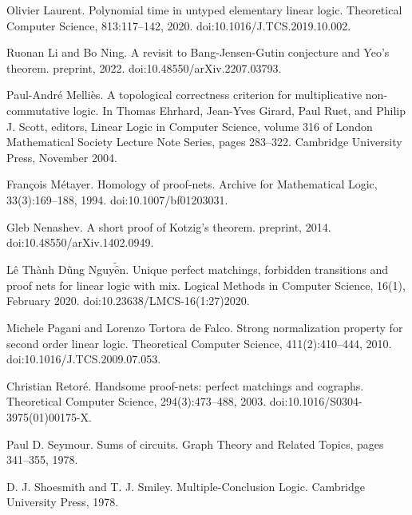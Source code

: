 \par\noindent  [27]  Olivier Laurent.  Polynomial time in untyped elementary linear logic.  Theoretical Computer Science, 813:117–142, 2020.  doi:10.1016/J.TCS.2019.10.002.  
 
\par\noindent  [28]  Ruonan Li and Bo Ning.  A revisit to Bang-Jensen-Gutin conjecture and Yeo’s theorem.  preprint, 2022.  doi:10.48550/arXiv.2207.03793.  
 
\par\noindent  [29]  Paul-André Melliès.  A topological correctness criterion for multiplicative non-commutative logic.  In Thomas Ehrhard, Jean-Yves Girard, Paul Ruet, and Philip J. Scott, editors, Linear Logic in Computer Science, volume 316 of London Mathematical Society Lecture Note Series, pages 283–322. Cambridge University Press, November 2004.  
 
\par\noindent  [30]  François Métayer.  Homology of proof-nets.  Archive for Mathematical Logic, 33(3):169–188, 1994.  doi:10.1007/bf01203031.  
 
\par\noindent  [31]  Gleb Nenashev.  A short proof of Kotzig’s theorem.  preprint, 2014.  doi:10.48550/arXiv.1402.0949.  
 
\par\noindent  [32]  Lê Thành Dũng Nguy$\tilde{\hat{\text{e}}}$n.  Unique perfect matchings, forbidden transitions and proof nets for linear logic with mix.  Logical Methods in Computer Science, 16(1), February 2020.  doi:10.23638/LMCS-16(1:27)2020.  
 
\par\noindent  [33]  Michele Pagani and Lorenzo Tortora de Falco.  Strong normalization property for second order linear logic.  Theoretical Computer Science, 411(2):410–444, 2010.  doi:10.1016/J.TCS.2009.07.053.  
 
\par\noindent  [34]  Christian Retoré.  Handsome proof-nets: perfect matchings and cographs.  Theoretical Computer Science, 294(3):473–488, 2003.  doi:10.1016/S0304-3975(01)00175-X.  
 
\par\noindent  [35]  Paul D. Seymour.  Sums of circuits.  Graph Theory and Related Topics, pages 341–355, 1978.  
 
\par\noindent  [36]  D. J. Shoesmith and T. J. Smiley.  Multiple-Conclusion Logic.  Cambridge University Press, 1978.  
 
